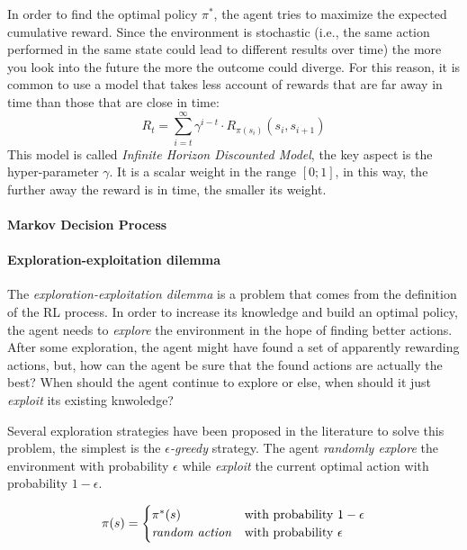 \documentclass[12pt,a4paper,openright,twoside]{book}
\begin{document}
    In order to find the optimal policy $\pi^*$, the agent tries to maximize the expected cumulative reward.
        Since the environment is stochastic (i.e., the same action performed in the same state could lead to different 
        results over time) the more you look into the future the more the outcome could diverge.
        For this reason, it is common to use a model that takes less account of rewards that are far away in time 
        than those that are close in time:
        $$R_t = \sum_{i=t}^{\infty} \gamma^{i-t} \cdot R_{\pi(s_i)}(s_i, s_{i+1}) $$
        This model is called \emph{Infinite Horizon Discounted Model}, the key aspect is the hyper-parameter $\gamma$.
        It is a scalar weight in the range $[0;1]$, in this way, the further away the reward is in time, the smaller its weight.
\paragraph{Markov Decision Process} 


\paragraph{Exploration-exploitation dilemma}

The \emph{exploration-exploitation dilemma} is a problem that comes from the definition of the RL process.
    In order to increase its knowledge and build an optimal policy, the agent needs to \emph{explore} the environment 
    in the hope of finding better actions. After some exploration, the agent might have found a set of 
    apparently rewarding actions, but, how can the agent be sure that the found actions are actually the best? 
    When should the agent continue to explore or else, when should it just \emph{exploit} its existing knwoledge?

Several exploration strategies have been proposed in the literature to solve this problem, the simplest is the
    \emph{$\epsilon$-greedy} strategy. The agent \emph{randomly explore} the environment with probability $\epsilon$
    while \emph{exploit} the current optimal action with probability $1-\epsilon$.

    $$
    \pi(s)=
    \begin{cases}
        \pi^*(s) & \text{with probability $1-\epsilon$} \\
        \text{\emph{random action}} & \text{with probability $\epsilon$}\\
    \end{cases} 
    $$ 
\end{document}
